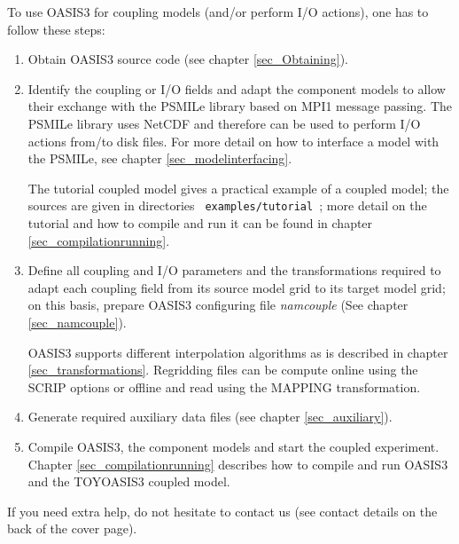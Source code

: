 To use OASIS3 for coupling models (and/or perform I/O
actions), one has to follow these steps:
\begin{enumerate}
\item Obtain OASIS3 source code (see chapter \ref{sec_Obtaining}).
\item Identify the coupling or I/O fields and adapt the component
  models to allow their exchange with the PSMILe library based on MPI1
  message passing.
  The PSMILe library uses NetCDF and therefore can be used to perform I/O actions
  from/to disk files.  For more detail on how to interface a model
  with the PSMILe, see chapter \ref{sec_modelinterfacing}.

The tutorial coupled model gives a practical example of a coupled
model; the sources are given in directories {\tt
  examples/tutorial }; more detail on the tutorial and
how to compile and run it can be found in chapter
\ref{sec_compilationrunning}.

\item Define all coupling and I/O parameters and the transformations
  required to adapt each coupling field from its source model grid to
  its target model grid; on this basis, prepare OASIS3 configuring file 
  {\it namcouple} (See chapter \ref{sec_namcouple}). 
  
  OASIS3 supports different interpolation algorithms as is described in
  chapter \ref{sec_transformations}.  Regridding files can be compute
  online using the SCRIP options or offline and read using the MAPPING
  transformation.

\item Generate required auxiliary data files (see chapter
  \ref{sec_auxiliary}).
\item Compile OASIS3, the component models and start the coupled
  experiment. Chapter \ref{sec_compilationrunning} describes how to
  compile and run OASIS3 and the TOYOASIS3 coupled model.

\end{enumerate}

If you need extra help, do not hesitate to contact us (see contact
details on the back of the cover page).

